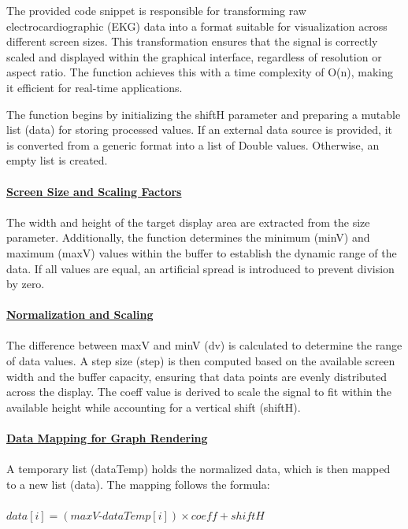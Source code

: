 {{	The provided code snippet is responsible for transforming raw electrocardiographic (EKG) data into a format suitable for visualization across different screen sizes. This transformation ensures that the signal is correctly scaled and displayed within the graphical interface, regardless of resolution or aspect ratio. The function achieves this with a time complexity of O(n), making it efficient for real-time applications.
	
	
	The function begins by initializing the shiftH parameter and preparing a mutable list (data) for storing processed values. If an external data source is provided, it is converted from a generic format into a list of Double values. Otherwise, an empty list is created.\mbox{}\\
	\mbox{}\\
	\underline{\textbf{Screen Size and Scaling Factors}}\mbox{}\\
	\mbox{}\\
	The width and height of the target display area are extracted from the size parameter. Additionally, the function determines the minimum (minV) and maximum (maxV) values within the buffer to establish the dynamic range of the data. If all values are equal, an artificial spread is introduced to prevent division by zero.\mbox{}\\
	\mbox{}\\
	\underline{\textbf{Normalization and Scaling}}\mbox{}\\
	\mbox{}\\
	The difference between maxV and minV (dv) is calculated to determine the range of data values. A step size (step) is then computed based on the available screen width and the buffer capacity, ensuring that data points are evenly distributed across the display. The coeff value is derived to scale the signal to fit within the available height while accounting for a vertical shift (shiftH).\mbox{}\\
	\mbox{}\\
	\underline{\textbf{Data Mapping for Graph Rendering}}\mbox{}\\
	\mbox{}\\
	A temporary list (dataTemp) holds the normalized data, which is then mapped to a new list (data). The mapping follows the formula:\mbox{}\\
	\mbox{}\\
	$data[i]=(maxV \text{-} dataTemp[i]) \times coeff+shiftH$ \mbox{}\\
	\mbox{}\\
}}

